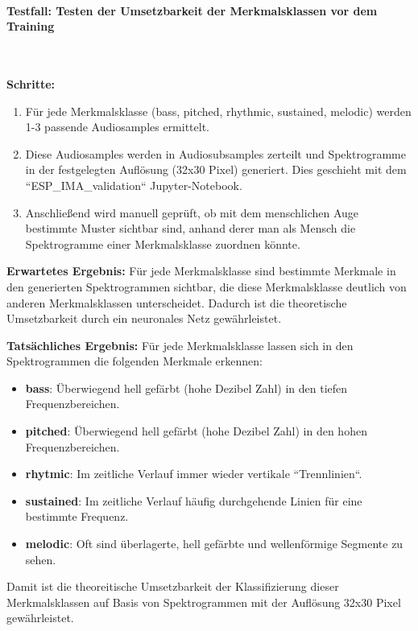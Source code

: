 \paragraph{Testfall: Testen der Umsetzbarkeit der Merkmalsklassen vor dem Training}\mbox{}\\
\begin{adjustwidth}{0.5cm}{0cm}
\textbf{Schritte:}

\begin{enumerate}
	\item Für jede Merkmalsklasse (bass, pitched, rhythmic, sustained, melodic) werden 1-3 passende Audiosamples ermittelt.
	\item Diese Audiosamples werden in Audiosubsamples zerteilt und Spektrogramme in der festgelegten Auflösung (32x30 Pixel) generiert. Dies geschieht mit dem ``ESP\_IMA\_validation`` Jupyter-Notebook.
	\item Anschließend wird manuell geprüft, ob mit dem menschlichen Auge bestimmte Muster sichtbar sind, anhand derer man als Mensch die Spektrogramme einer Merkmalsklasse zuordnen könnte.
\end{enumerate}

\textbf{Erwartetes Ergebnis:} 
Für jede Merkmalsklasse sind bestimmte Merkmale in den generierten Spektrogrammen sichtbar, die diese Merkmalsklasse deutlich von anderen Merkmalsklassen unterscheidet. Dadurch ist die theoretische Umsetzbarkeit durch ein neuronales Netz gewährleistet.

\textbf{Tatsächliches Ergebnis:} Für jede Merkmalsklasse lassen sich in den Spektrogrammen die folgenden Merkmale erkennen:

\begin{itemize}
  \item \textbf{bass}: Überwiegend hell gefärbt (hohe Dezibel Zahl) in den tiefen Frequenzbereichen.
  \item \textbf{pitched}: Überwiegend hell gefärbt (hohe Dezibel Zahl) in den hohen Frequenzbereichen.
  \item \textbf{rhytmic}: Im zeitliche Verlauf immer wieder vertikale ``Trennlinien``.
  \item \textbf{sustained}: Im zeitliche Verlauf häufig durchgehende Linien für eine bestimmte Frequenz.
  \item \textbf{melodic}: Oft sind überlagerte, hell gefärbte und wellenförmige Segmente zu sehen.
\end{itemize}

Damit ist die theoreitische Umsetzbarkeit der Klassifizierung dieser Merkmalsklassen auf Basis von Spektrogrammen mit der Auflösung 32x30 Pixel gewährleistet.

\end{adjustwidth}



